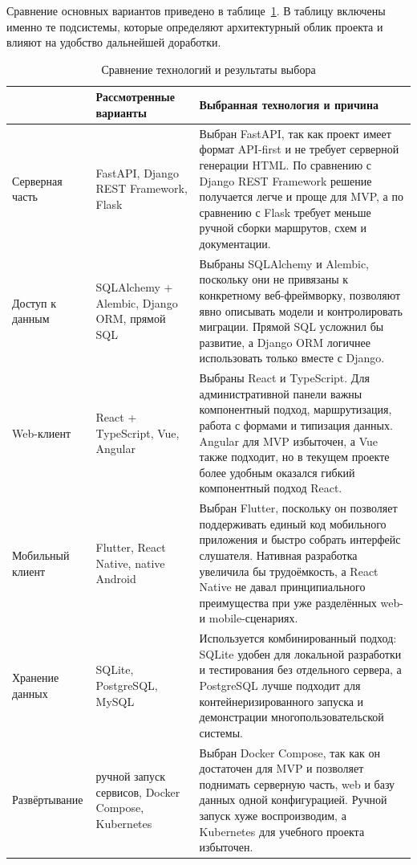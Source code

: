 Сравнение основных вариантов приведено в таблице~\ref{tab:analysis-tech-choice}. В таблицу включены именно те подсистемы, которые определяют архитектурный облик проекта и влияют на удобство дальнейшей доработки.

\begin{table}[H]
\centering
\caption{Сравнение технологий и результаты выбора}
\label{tab:analysis-tech-choice}
{\fontsize{12pt}{12pt}\selectfont
\setlength{\tabcolsep}{5pt}
\renewcommand{\arraystretch}{1.15}
\begin{tabularx}{\textwidth}{|>{\RaggedRight\arraybackslash}p{32mm}|>{\RaggedRight\arraybackslash}p{45mm}|>{\RaggedRight\arraybackslash}X|}
\hline
{\centering\arraybackslash\textbf{Подсистема}} & {\centering\arraybackslash\textbf{Рассмотренные варианты}} & {\centering\arraybackslash\textbf{Выбранная технология и причина}} \\
\hline
Серверная часть & FastAPI, Django REST Framework, Flask & Выбран FastAPI, так как проект имеет формат API-first и не требует серверной генерации HTML. По сравнению с Django REST Framework решение получается легче и проще для MVP, а по сравнению с Flask требует меньше ручной сборки маршрутов, схем и документации. \\
\hline
Доступ к данным & SQLAlchemy + Alembic, Django ORM, прямой SQL & Выбраны SQLAlchemy и Alembic, поскольку они не привязаны к конкретному веб-фреймворку, позволяют явно описывать модели и контролировать миграции. Прямой SQL усложнил бы развитие, а Django ORM логичнее использовать только вместе с Django. \\
\hline
Web-клиент & React + TypeScript, Vue, Angular & Выбраны React и TypeScript. Для административной панели важны компонентный подход, маршрутизация, работа с формами и типизация данных. Angular для MVP избыточен, а Vue также подходит, но в текущем проекте более удобным оказался гибкий компонентный подход React. \\
\hline
Мобильный клиент & Flutter, React Native, native Android & Выбран Flutter, поскольку он позволяет поддерживать единый код мобильного приложения и быстро собрать интерфейс слушателя. Нативная разработка увеличила бы трудоёмкость, а React Native не давал принципиального преимущества при уже разделённых web- и mobile-сценариях. \\
\hline
Хранение данных & SQLite, PostgreSQL, MySQL & Используется комбинированный подход: SQLite удобен для локальной разработки и тестирования без отдельного сервера, а PostgreSQL лучше подходит для контейнеризированного запуска и демонстрации многопользовательской системы. \\
\hline
Развёртывание & ручной запуск сервисов, Docker Compose, Kubernetes & Выбран Docker Compose, так как он достаточен для MVP и позволяет поднимать серверную часть, web и базу данных одной конфигурацией. Ручной запуск хуже воспроизводим, а Kubernetes для учебного проекта избыточен. \\
\hline
\end{tabularx}
}
\end{table}

